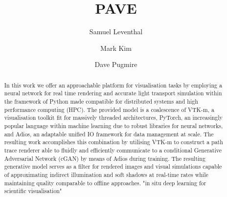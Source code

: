 \documentclass[sigconf]{acmart}%
\begin{document}
\title{PAVE}

\author{Samuel Leventhal}
\authornotemark[1]
\author{Mark Kim}

\author{Dave Pugmire}


\renewcommand{\shortauthors}{Leventhal and Kim, et al.}

\begin{abstract}
  In this work we offer an approachable platform for visualisation tasks by employing a neural network for real time rendering and accurate light transport simulation within the framework of Python made compatible for distributed systems and high performance computing (HPC). The provided model is a coalescence of VTK-m, a visualisation toolkit fit for massively threaded architectures, PyTorch, an  increasingly popular language within machine learning due to robust libraries for neural networks, and Adios, an adaptable unified IO framework for data management at scale. The resulting work accomplishes this combination by utilising VTK-m to construct a path trace renderer able to fluidly and efficiently communicate to a conditional Generative Adversarial Network (cGAN) by means of Adios during training. The resulting generative model serves as a filter for rendered images and visual simulations capable of approximating indirect illumination and soft shadows at real-time rates while maintaining quality comparable to offline approaches. "in situ deep learning for scientific visualisation"
\end{abstract}
\end{document}
